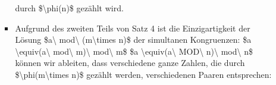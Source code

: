 \documentclass[a4paper]{article}
\begin{document}
\begin{multicols}{3}
\begin{itemize}
\begin{itemize}
\begin{itemize}
                                  durch \$\textbackslash phi(n)\$ gezählt wird.
                            \item
                                  Aufgrund des zweiten Teils von Satz 4 ist die Einzigartigkeit der
                                  Lösung \$a\textbackslash{} mod\textbackslash{}
                                  (m\textbackslash times n)\$ der simultanen Kongruenzen: \$a
                                  \textbackslash equiv(a\textbackslash{} mod\textbackslash{}
                                  m)\textbackslash{} mod\textbackslash{} m\$ \$a
                                  \textbackslash equiv(a\textbackslash{} MOD\textbackslash{}
                                  n)\textbackslash{} mod\textbackslash{} n\$ können wir ableiten,
                                  dass verschiedene ganze Zahlen, die durch
                                  \$\textbackslash phi(m\textbackslash times n)\$ gezählt werden,
                                  verschiedenen Paaren entsprechen:


\end{itemize}
\end{itemize}
\end{itemize}
\end{multicols}
\end{document}
